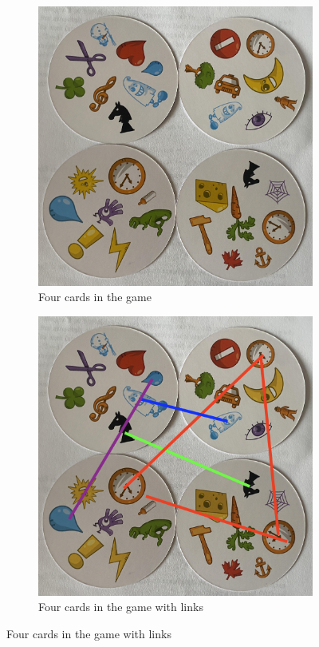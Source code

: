 \documentclass[11pt, oneside]{article} 	%
\begin{document}
\begin{figure}[!htb]
\centering
\begin{subfigure}{.2\textwidth}
\includegraphics[scale=.2]{cards}
\caption{Four cards in the game}
\label{fig:cards}
\end{subfigure}

\begin{subfigure}{.2\textwidth}
\includegraphics[scale=.2]{cards-links}
\caption{Four cards in the game with links}
\label{fig:cards-links}
\end{subfigure}


\end{figure}
\end{document}
